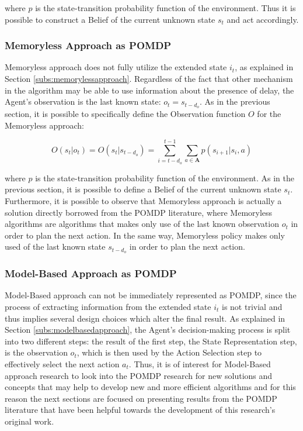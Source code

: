                where $p$ is the state-transition probability function of the environment. Thus it is possible to construct a Belief of the current unknown state $s_t$ and act accordingly.
            
            \subsubsection{Memoryless Approach as POMDP}
                Memoryless approach does not fully utilize the extended state $i_t$, as explained in Section \ref{subs:memorylessapproach}. Regardless of the fact that other mechanism in the algorithm may be able to use information about the presence of delay, the Agent's observation is the last known state: $o_t = s_{t-d_o}$. As in the previous section, it is possible to specifically define the Observation function $O$ for the Memoryless approach:
                
                \[ O(s_t|o_t) = O(s_t|s_{t-d_o}) = \sum_{i = t - d_o}^{t-1} \sum_{a \in \mathbf{A}} p(s_{i+1}|s_{i}, a)\]
                
                where $p$ is the state-transition probability function of the environment. As in the previous section, it is possible to define a Belief of the current unknown state $s_t$. \newline
                Furthermore, it is possible to observe that Memoryless approach is actually a solution directly borrowed from the POMDP literature, where Memoryless algorithms are algorithms that makes only use of the last known observation $o_t$ in order to plan the next action. In the same way, Memoryless policy makes only used of the last known state $s_{t-d_o}$ in order to plan the next action.
            
            \subsubsection{Model-Based Approach as POMDP}
                Model-Based approach can not be immediately represented as POMDP, since the process of extracting information from the extended state $i_t$ is not trivial and thus implies several design choices which alter the final result. As explained in Section \ref{subs:modelbasedapproach}, the Agent's decision-making process is split into two different steps: the result of the first step, the State Representation step, is the observation $o_t$, which is then used by the Action Selection step to effectively select the next action $a_t$. \newline
                Thus, it is of interest for Model-Based approach research to look into the POMDP research for new solutions and concepts that may help to develop new and more efficient algorithms and for this reason the next sections are focused on presenting results from the POMDP literature that have been helpful towards the development of this research's original work.
        
